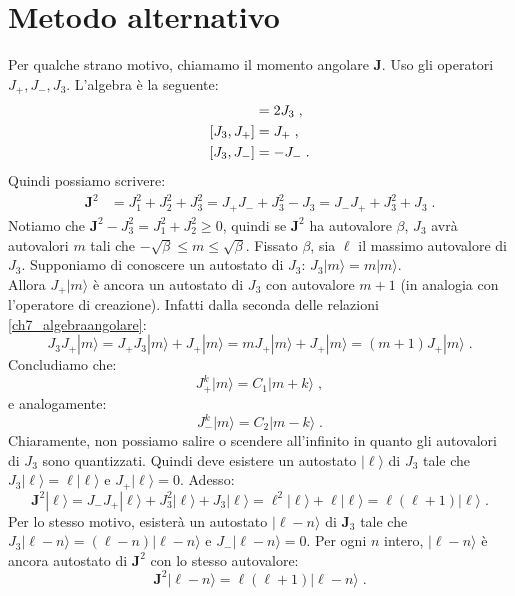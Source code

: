 \documentclass[12pt,a4paper]{report}
\theoremstyle{definition}
\numberwithin{equation}{section}
\newcommand{\ket}{\rangle}
\begin{document}
\section{Metodo alternativo}
Per qualche strano motivo, chiamamo il momento angolare $\mathbf{J}$. Uso gli operatori $J_+,J_-,J_3$. L'algebra è la seguente:
\begin{align}
[J_+,J_-]&= 2J_3 \notag\;, \\
[J_3,J_+]&= J_+ \notag\;, \\
[J_3,J_-]&= -J_-\;. \label{ch7_algebraangolare}
\end{align}
Quindi possiamo scrivere:
\begin{align}
\mathbf{J}^2 &= J_1^2+J_2^2+J_3^2 = J_+J_-+J_3^2-J_3 =  J_-J_++J_3^2+J_3\;.
\end{align}
Notiamo che $\mathbf{J}^2-J_3^2=J_1^2+J_2^2\ge 0$, quindi se $\mathbf{J}^2$ ha autovalore $\beta$, $J_3$ avrà autovalori $m$ tali che $-\sqrt{\beta}\le m\le \sqrt{\beta}$. Fissato $\beta$, sia $\ell$ il massimo autovalore di $J_3$. Supponiamo di conoscere un autostato di $J_3$: $J_3|m\ket=m|m\ket$.\\
Allora $J_+|m\ket$ è ancora un autostato di $J_3$ con autovalore $m+1$ (in analogia con l'operatore di creazione). Infatti dalla seconda delle relazioni \eqref{ch7_algebraangolare}: 
\begin{equation}
J_3J_+|m\ket=J_+J_3|m\ket+J_+|m\ket=mJ_+|m\ket+J_+|m\ket=(m+1)J_+|m\ket\;.
\end{equation}
Concludiamo che:
\begin{equation}
J_+^k|m\ket=C_1|m+k\ket\;,
\end{equation}
e analogamente:
\begin{equation}
J_-^k|m\ket=C_2|m-k\ket\;.
\end{equation}
Chiaramente, non possiamo salire o scendere all'infinito in quanto gli autovalori di $J_3$ sono quantizzati. Quindi deve esistere un autostato $|\ell\ket$ di $J_3$ tale che $J_3|\ell\ket=\ell|\ell\ket$ e $J_+|\ell\ket=0$. Adesso:
\begin{equation}
\mathbf{J}^2|\ell\ket=J_-J_+|\ell\ket+J_3^2|\ell\ket+J_3|\ell\ket=\ell^2|\ell\ket+\ell|\ell\ket=\ell(\ell+1)|\ell\ket\;.
\end{equation}
Per lo stesso motivo, esisterà un autostato $|\ell-n\ket$ di $\mathbf{J}_3$ tale che $J_3|\ell-n\ket=(\ell-n)|\ell-n\ket$ e $J_-|\ell-n\ket=0$. Per ogni $n$ intero, $|\ell-n\ket$ è ancora autostato di $\mathbf{J}^2$ con lo stesso autovalore:
\begin{equation}
\mathbf{J}^2|\ell-n\ket=\ell(\ell+1)|\ell-n\ket\;.
\end{equation}
\end{document}
